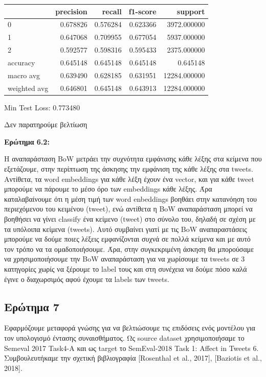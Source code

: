 \documentclass[12pt]{article}
\begin{document}
\begin{tabular}{lrrrr}
\toprule
{} &  precision &    recall &  f1-score &       support \\
\midrule
0            &   0.678826 &  0.576284 &  0.623366 &   3972.000000 \\
1            &   0.647068 &  0.709955 &  0.677054 &   5937.000000 \\
2            &   0.592577 &  0.598316 &  0.595433 &   2375.000000 \\
accuracy     &   0.645148 &  0.645148 &  0.645148 &      0.645148 \\
macro avg    &   0.639490 &  0.628185 &  0.631951 &  12284.000000 \\
weighted avg &   0.646801 &  0.645148 &  0.643913 &  12284.000000 \\
\bottomrule
\end{tabular}

Min Test Loss: 0.773480

Δεν παρατηρούμε βελτίωση

\textbf{Ερώτημα 6.2:}

Η αναπαράσταση BoW μετράει την συχνότητα εμφάνισης κάθε λέξης στα κείμενα που εξετάζουμε, στην περίπτωση της άσκησης την εμφάνιση της κάθε λέξης στα tweets. Αντίθετα, τα word embeddings για κάθε λέξη έχουν ένα vector, και για κάθε tweet μπορούμε να πάρουμε το μέσο όρο των embeddings κάθε λέξης. Άρα καταλαβαίνουμε ότι η μέση τιμή των word enbeddings βοηθάει στην κατανόηση του περιεχόμενου του κειμένου (tweet), ενώ αντίθετα η BoW αναπαράσταση μπορεί να βοηθήσει να γίνει classify ένα κείμενο (tweet) στο σύνολο του, δηλαδή σε σχέση με τα υπόλοιπα κείμενα (tweets). Αυτό συμβαίνει γιατί με τις BoW αναπαραστάσεις μπορούμε να δούμε ποιες λέξεις εμφανίζονται συχνά σε πολλά κείμενα και με αυτό τον τρόπο να τα ομαδοποιήσουμε. Άρα, στην συγκεκριμένη άσκηση θα μπορούσαμε να χρησιμοποιήσουμε την BoW αναπαράσταση για να χωρίσουμε τα tweets σε 3 κατηγορίες χωρίς να ξέρουμε το label τους και στη συνέχεια να δούμε πόσο καλά έγινε ο διαχωρσιμός αφού έχουμε τα labels των tweets.



\subsection{Ερώτημα 7}
Εφαρμόζουμε μεταφορά γνώσης για να βελτιώσουμε τις επιδόσεις ενός μοντέλου για τον υπολογισμό έντασης συναισθήματος. Ως source dataset χρησιμοποιήσαμε το 
Semeval 2017 Task4-A και ως target το SemEval-2018 Task 1: Affect in Tweets 6. Συμβουλευτήκαμε την σχετική βιβλιογραφία [Rosenthal et al., 2017], [Baziotis et al., 2018].
\end{document}
